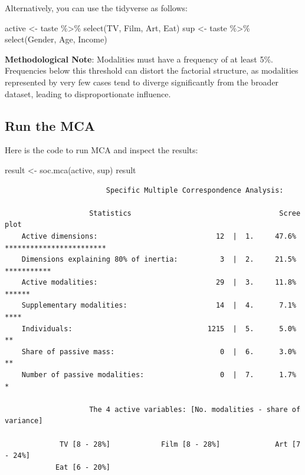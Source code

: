 \documentclass[
  letterpaper,
  DIV=11,
  numbers=noendperiod]{scrartcl}
\newenvironment{Shaded}{\begin{snugshade}}{\end{snugshade}}
\newcommand{\FunctionTok}[1]{\textcolor[rgb]{0.28,0.35,0.67}{#1}}
\newcommand{\NormalTok}[1]{\textcolor[rgb]{0.00,0.23,0.31}{#1}}
\newcommand{\OtherTok}[1]{\textcolor[rgb]{0.00,0.23,0.31}{#1}}
\newcommand{\SpecialCharTok}[1]{\textcolor[rgb]{0.37,0.37,0.37}{#1}}
\begin{document}
\normalsize

Alternatively, you can use the tidyverse as follows:

\scriptsize

\begin{Shaded}
\begin{Highlighting}[]
\NormalTok{active }\OtherTok{\textless{}{-}}\NormalTok{ taste }\SpecialCharTok{\%\textgreater{}\%} \FunctionTok{select}\NormalTok{(TV, Film, Art, Eat)}
\NormalTok{sup }\OtherTok{\textless{}{-}}\NormalTok{ taste }\SpecialCharTok{\%\textgreater{}\%} \FunctionTok{select}\NormalTok{(Gender, Age, Income)}
\end{Highlighting}
\end{Shaded}

\normalsize

\textbf{Methodological Note}: Modalities must have a frequency of at
least 5\%. Frequencies below this threshold can distort the factorial
structure, as modalities represented by very few cases tend to diverge
significantly from the broader dataset, leading to disproportionate
influence.

\subsection{Run the MCA}\label{run-the-mca}

Here is the code to run MCA and inspect the results:

\scriptsize

\begin{Shaded}
\begin{Highlighting}[]
\NormalTok{result         }\OtherTok{\textless{}{-}} \FunctionTok{soc.mca}\NormalTok{(active, sup)}
\NormalTok{result}
\end{Highlighting}
\end{Shaded}

\begin{verbatim}
                        Specific Multiple Correspondence Analysis:                         
 
                    Statistics                                   Scree plot               
    Active dimensions:                            12  |  1.     47.6%   ************************
    Dimensions explaining 80% of inertia:          3  |  2.     21.5%   ***********
    Active modalities:                            29  |  3.     11.8%   ******
    Supplementary modalities:                     14  |  4.      7.1%   ****
    Individuals:                                1215  |  5.      5.0%   **
    Share of passive mass:                         0  |  6.      3.0%   **
    Number of passive modalities:                  0  |  7.      1.7%   *

                    The 4 active variables: [No. modalities - share of variance]                    

             TV [8 - 28%]            Film [8 - 28%]             Art [7 - 24%] 
            Eat [6 - 20%]
\end{verbatim}
\end{document}
